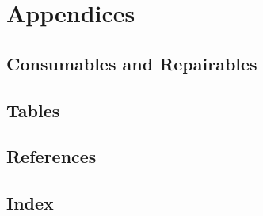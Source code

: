 \documentclass[11pt,fleqn]{book} %
\begin{document}
\part{Appendices}
\begin{appendices}
	
  \chapter{Consumables and Repairables}
  \label{app:consumables-and-repairables}
  
  \chapter{Tables}
  \label{app:tables}
  
  \chapter{References}
  \label{app:references}
  
  \chapter{Index}
  \label{app:index}
  
\end{appendices}

\cleardoublepage %
\setlength{\columnsep}{0.75cm} %
\printindex %
\end{document}
